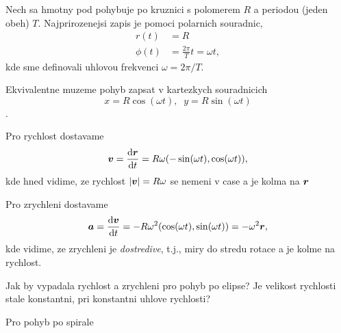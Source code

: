 \begin{priklad}
    Nech sa hmotny pod pohybuje po kruznici s polomerem $R$ a periodou (jeden obeh) $T$. Najprirozenejsi zapis je pomoci polarnich souradnic,
    \begin{align*}
        r(t) &= R\\
        \phi(t) &= \frac{2\pi}{T}t = \omega t,
    \end{align*}
    kde sme definovali uhlovou frekvenci $\omega = 2\pi/T$.

    Ekvivalentne muzeme pohyb zapsat v kartezkych souradnicich
    $$ x = R \cos(\omega t),\;\; y = R \sin(\omega t) $$.

    Pro rychlost dostavame
    $$ \bm{v} = \frac{\mathop{}\!\mathrm{d} \bm{r}}{\mathop{}\!\mathrm{d} t} = R\omega (-\sin(\omega t), \cos(\omega t)), $$
    kde hned vidime, ze rychlost $|\bm{v}| = R\omega$ se nemeni v case a je kolma na $\bm{r}$

    Pro  zrychleni dostavame
    $$ \bm{a} = \frac{\mathop{}\!\mathrm{d} \bm{v}}{\mathop{}\!\mathrm{d} t} = -R\omega^2 (\cos(\omega t), \sin(\omega t)) = - \omega^2 \bm{r}, $$
    kde vidime, ze zrychleni je \emph{dostredive}, t.j., miry do stredu rotace a je kolme na rychlost.

    Jak by vypadala rychlost a zrychleni pro pohyb po elipse? Je velikost rychlosti stale konstantni, pri konstantni uhlove rychlosti?
\end{priklad}

Pro pohyb po spirale




